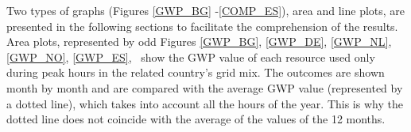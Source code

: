  \begin{table}[]
\centering
\caption{Emission factors of power production technologies. Extracted from \cite{Turconi2013LifeLimitations}.}
\label{EmissionFactors}
\end{table}



Two types of graphs (Figures \ref{GWP_BG} -\ref{COMP_ES}), area and line plots, are presented in the following sections to facilitate the comprehension of the results. Area plots, represented by odd Figures \ref{GWP_BG}, \ref{GWP_DE}, \ref{GWP_NL}, \ref{GWP_NO}, \ref{GWP_ES}, 
~show the GWP value of each resource used only during peak hours in the related country's grid mix. The outcomes are shown month by month and are compared with the average GWP value (represented by a dotted line), which takes into account all the hours of the year. This is why the dotted line does not coincide with the average of the values of the 12 months. %

